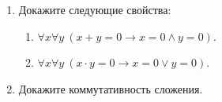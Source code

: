 \begin{enumerate}
\item Докажите следующие свойства:
\begin{enumerate}
\item $\forall x \forall y\ (x + y = 0 \to x = 0 \land y = 0)$.
\item $\forall x \forall y\ (x \cdot y = 0 \to x = 0 \lor y = 0)$.
\end{enumerate}

\item Докажите коммутативность сложения.

\end{enumerate}

